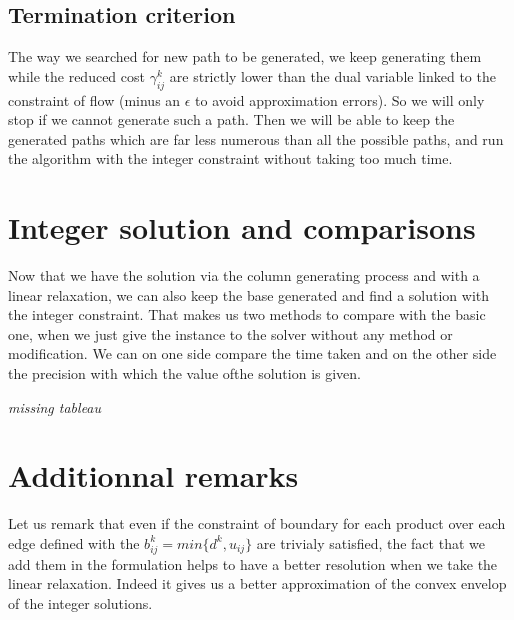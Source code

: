 \subsection{Termination criterion}

The way we searched for new path to be generated, we keep generating them while the reduced cost $\gamma^k_{ij}$ are strictly lower than the dual variable linked to the constraint of flow (minus an $\epsilon$ to avoid approximation errors). So we will only stop if we cannot generate such a path. Then we will be able to keep the generated paths which are far less numerous than all the possible paths, and run the algorithm with the integer constraint without taking too much time.

\section{Integer solution and comparisons}

Now that we have the solution via the column generating process and with a linear relaxation, we can also keep the base generated and find a solution with the integer constraint. That makes us two methods to compare with the basic one, when we just give the instance to the solver without any method or modification. We can on one side compare the time taken and on the other side the precision with which the value ofthe solution is given.

{\it missing tableau}

\section{Additionnal remarks}

Let us remark that even if the constraint of boundary for each product over each edge defined with the $b^k_{ij}=min\{d^k,u_{ij}\}$ are trivialy satisfied, the fact that we add them in the formulation helps to have a better resolution when we take the linear relaxation. Indeed it gives us a better approximation of the convex envelop of the integer solutions.










